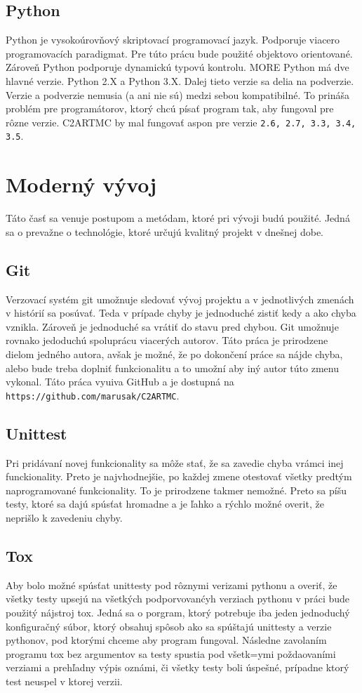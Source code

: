 \subsection{Python}
Python je vysokoúrovňový skriptovací programovací jazyk. Podporuje viacero programovacích
paradigmat. Pre túto prácu bude použité objektovo orientované. Zároveň Python podporuje
dynamickú typovú kontrolu. MORE
Python má dve hlavné verzie. Python 2.X a Python 3.X. Dalej tieto verzie sa delia na podverzie.
Verzie a podverzie nemusia (a ani nie sú) medzi sebou kompatibilné. To prináša problém
pre programátorov, ktorý chcú písať program tak, aby fungoval pre rôzne verzie.
C2ARTMC by mal fungovať aspon pre verzie \texttt{2.6, 2.7, 3.3, 3.4, 3.5}.

\section{Moderný vývoj}
Táto časť sa venuje postupom a metódam, ktoré pri vývoji budú použité. Jedná sa
o prevažne o technológie, ktoré určujú kvalitný projekt v dnešnej dobe.

\subsection{Git}
Verzovací systém git umožnuje sledovať vývoj projektu a v jednotlivých zmenách
v histórií sa posúvať. Teda v prípade chyby je jednoduché zistiť kedy a ako chyba
vznikla. Zároveň je jednoduché sa vrátiť do stavu pred chybou.
Git umožnuje rovnako jedoduchú spoluprácu viacerých autorov. Táto práca je
prirodzene dielom jedného autora, avšak je možné, že po dokončení práce sa nájde
chyba, alebo bude treba doplniť funkcionalitu a to umožní aby iný autor túto zmenu
vykonal.
Táto práca vyuiva GitHub a je dostupná na \texttt{https://github.com/marusak/C2ARTMC}.

\subsection{Unittest}
Pri pridávaní novej funkcionality sa môže stať, že sa zavedie chyba vrámci inej
funckionality. Preto je najvhodnejšie, po každej zmene otestovať všetky predtým
naprogramované funkcionality. To je prirodzene takmer nemožné. Preto sa píšu testy,
ktoré sa dajú spúsťat hromadne a je ľahko a rýchlo možné overit, že neprišlo k
zavedeniu chyby.

\subsection{Tox}
Aby bolo možné spúsťat unittesty pod rôznymi verizami pythonu a overiť, že všetky testy
upsejú na všetkých podporvovanćyh verziach pythonu v práci bude použitý nájstroj tox.
Jedná sa o porgram, ktorý potrebuje iba jeden jednoduchý konfiguračný súbor, ktorý
obsahuj spôsob ako sa spúštajú unittesty a verzie pythonov, pod ktorými chceme
aby program fungoval. Následne zavolaním programu tox bez argumentov sa testy
spustia pod všetk=ymi poždaovaními verziami a prehľadny výpis oznámi, či všetky
testy boli úspešné, prípadne ktorý test neuspel v ktorej verzii.



